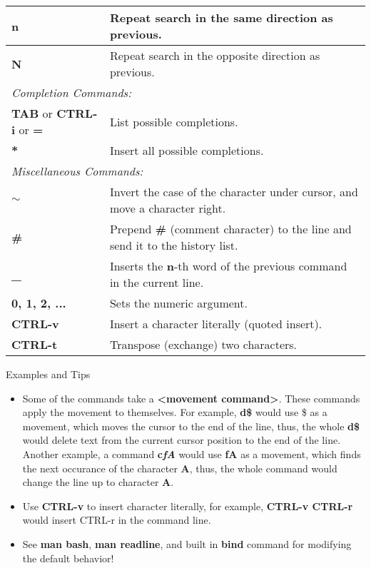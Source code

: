 \documentclass{article}
\begin{document}
\begin{tabular}{|p{4.5cm}|p{13cm}|}
\hline
\textbf{n} & Repeat search in the same direction as previous. \\
\hline
\textbf{N} & Repeat search in the opposite direction as previous. \\
\hline
\multicolumn{2}{|l|}{\small\it{Completion Commands:}} \\
\hline
\textbf{TAB} or \textbf{CTRL-i} or \textbf{=} & List possible completions. \\
\hline
\textbf{*} & Insert all possible completions. \\
\hline
\multicolumn{2}{|l|}{\small\it{Miscellaneous Commands:}} \\
\hline
\textbf{$\sim$} & Invert the case of the character under cursor, and move a character right. \\
\hline
\textbf{\#} & Prepend \textbf{\#} (comment character) to the line and send it to the history list. \\
\hline
\textbf{\_} &  Inserts the \textbf{n}-th word of the previous command in the current line. \\
\hline
\textbf{0, 1, 2, ...} & Sets the numeric argument. \\
\hline
\textbf{CTRL-v} & Insert a character literally (quoted insert). \\
\hline
\textbf{CTRL-t} & Transpose (exchange) two characters. \\
\hline
\end{tabular}

\vspace{2mm}
\begin{center}
\large Examples and Tips
\end{center}

\begin{itemize}
\item Some of the commands take a \textbf{{\textless}movement command{\textgreater}}. These commands apply the movement to themselves. For example, \textbf{d\$} would use \$ as a movement, which moves the cursor to the end of the line, thus, the whole \textbf{d\$} would delete text from the current cursor position to the end of the line. Another example, a command \textbf{c\textit{fA}} would use \textbf{fA} as a movement, which finds the next occurance of the character {\bf A}, thus, the whole command would change the line up to character {\bf A}.
\item Use \textbf{CTRL-v} to insert character literally, for example, \textbf{CTRL-v CTRL-r} would insert CTRL-r in the command line.
\item See \textbf{man bash}, \textbf{man readline}, and built in \textbf{bind} command for modifying the default behavior!
\end{itemize}

\vfill

\end{document}
